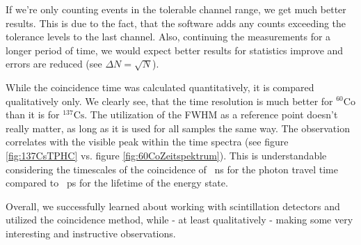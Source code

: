 If we're only counting events in the tolerable channel range, we get much better results.
This is due to the fact, that the software adds any counts exceeding the tolerance levels to the last channel.
Also, continuing the measurements for a longer period of time, we would expect better results for statistics improve and errors are reduced (see $\Delta N = \sqrt{N}$).
%
\par
%
While the coincidence time was calculated quantitatively, it is compared qualitatively only.
We clearly see, that the time resolution is much better for $^{60}\text{Co}$ than it is for $^{137}\text{Cs}$.
The utilization of the FWHM as a reference point doesn't really matter, as long as it is used for all samples the same way.
The observation correlates with the visible peak within the time spectra (see figure \ref{fig:137CsTPHC} vs. figure \ref{fig:60CoZeitspektrum}).
This is understandable considering the timescales of the coincidence of \SI{}{\nano\second} for the photon travel time compared to \SI{}{\pico\second} for the lifetime of the energy state.
%
\par
%
Overall, we successfully learned about working with scintillation detectors and utilized the coincidence method, while - at least qualitatively - making some very interesting and instructive observations.
